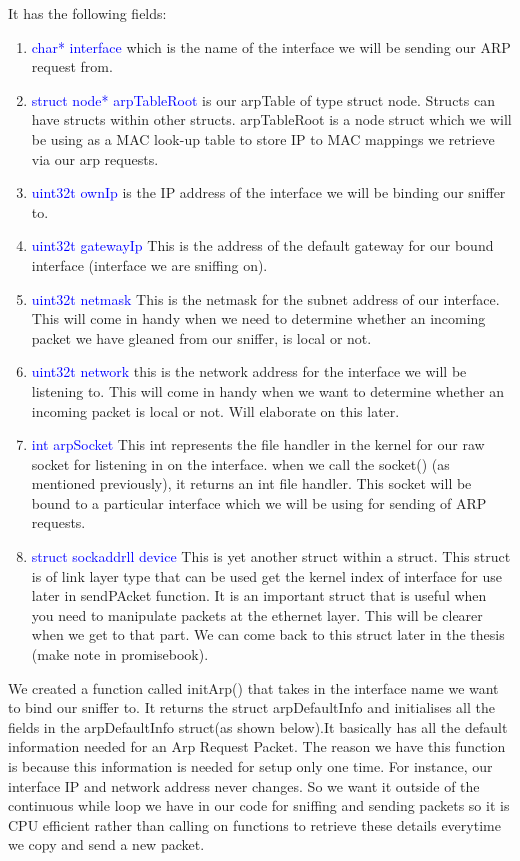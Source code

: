 \documentclass{uathesis}
\begin{document}
\begin{appendices}
It has the following fields:\\
\begin{enumerate}
\item \textcolor{blue}{char* interface} which is the name of the interface we will be sending our ARP request from.
\item \textcolor{blue}{struct node* arpTableRoot} is our arpTable of type struct node. Structs can have structs within other structs. arpTableRoot is a node struct which we will be using as a MAC look-up table to store IP to MAC mappings we retrieve via our arp requests.
\item \textcolor{blue}{uint32\textunderscore t ownIp} is the IP address of the interface we will be binding our sniffer to. 
\item \textcolor{blue}{uint32\textunderscore t gatewayIp} This is the address of the default gateway for our bound interface (interface we are sniffing on). 
\item \textcolor{blue}{uint32\textunderscore t netmask} This is the netmask for the subnet address of our interface. This will come in handy when we need to determine whether an incoming packet we have gleaned from our sniffer, is local or not. 
\item \textcolor{blue}{uint32\textunderscore t network} this is the network address for the interface we will be listening to. This will come in handy when we want to determine whether an incoming packet is local or not. Will elaborate on this later.
\item \textcolor{blue}{int arpSocket} This int represents the file handler in the kernel for our raw socket for listening in on the interface. when we call the socket() (as mentioned previously), it returns an int file handler. This socket will be bound to a particular interface which we will be using for sending of ARP requests. 
\item \textcolor{blue}{struct sockaddr\textunderscore ll device} This is yet another struct within a struct. This struct is of link layer type that can be used get the kernel index of interface for use later in sendPAcket function. It is an important struct that is useful when you need to manipulate packets at the ethernet layer. This will be clearer when we get to that part. We can come back to this struct later in the thesis (make note in promisebook).\\
\end{enumerate}

We created a function called initArp() that takes in the interface name we want to bind our sniffer to. It returns the struct arpDefaultInfo and initialises all the fields in the arpDefaultInfo struct(as shown below).It basically has all the default information needed for an Arp Request Packet. The reason we have this function is because this information is needed for setup only one time. For instance, our interface IP and network address never changes. So we want it outside of the continuous while loop we have in our code for sniffing and sending packets so it is CPU efficient rather than calling on functions to retrieve these details everytime we copy and send a new packet.  \\


\end{appendices}
\end{document}
